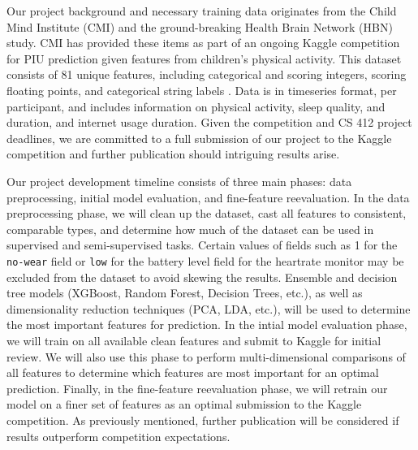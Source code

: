 \documentclass[12pt]{extarticle}
\begin{document}

Our project background and necessary training data originates from the Child Mind Institute (CMI) and the ground-breaking Health Brain Network (HBN) study.
CMI has provided these items as part of an ongoing Kaggle competition for PIU prediction given features from children's physical activity. 
This dataset consists of 81 unique features, including categorical and scoring integers, scoring floating points, and categorical string labels \cite{child-mind-institute-problematic-internet-use}.
Data is in timeseries format, per participant, and includes information on physical activity, sleep quality, and duration, and internet usage duration.
Given the competition and CS 412 project deadlines, we are committed to a full submission of our project to the Kaggle competition and further publication should intriguing results arise.


Our project development timeline consists of three main phases: data preprocessing, initial model evaluation, and fine-feature reevaluation.
In the data preprocessing phase, we will clean up the dataset, cast all features to consistent, comparable types, and determine how much of the dataset can be used in supervised and semi-supervised tasks. Certain values of fields such as 1 for the \texttt{no-wear} field or \texttt{low} for the battery level field for the heartrate monitor may be excluded from the dataset to avoid skewing the results.
Ensemble and decision tree models (XGBoost, Random Forest, Decision Trees, etc.), as well as dimensionality reduction techniques (PCA, LDA, etc.), will be used to determine the most important features for prediction.
In the intial model evaluation phase, we will train on all available clean features and submit to Kaggle for initial review. 
We will also use this phase to perform multi-dimensional comparisons of all features to determine which features are most important for an optimal prediction.
Finally, in the fine-feature reevaluation phase, we will retrain our model on a finer set of features as an optimal submission to the Kaggle competition.
As previously mentioned, further publication will be considered if results outperform competition expectations.



\end{document}
